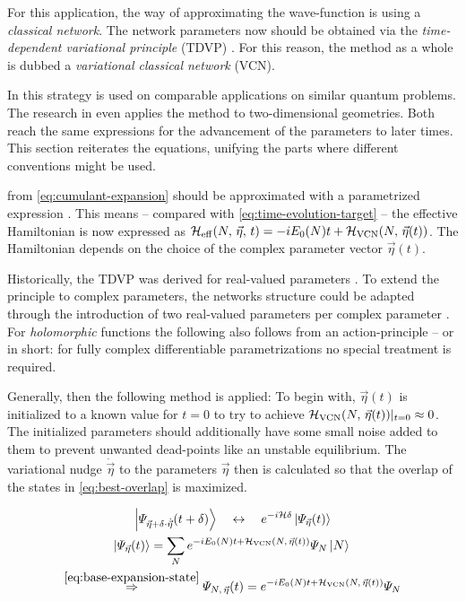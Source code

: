 For this application, the way of approximating the wave-function is using a \emph{classical network}. 
The network parameters now should be obtained via the \emph{time-dependent variational principle} (TDVP) \cite{originalDerivationTimeDependendVariationalPrinciple}.
For this reason, the method as a whole is dubbed a \emph{variational classical network} (VCN).

In \cite{variationalClassicalNetworksPaper} this strategy is used on comparable applications on similar quantum problems.
The research in \cite{probabilitySamplingRequirementVCN} even applies the method to two-dimensional geometries.
Both reach the same expressions for the advancement of the parameters to later times.
This section reiterates the equations, unifying the parts where different conventions might be used.

\HNOft from \autoref{eq:cumulant-expansion} should be approximated with a parametrized expression .
This means -- compared with \autoref{eq:time-evolution-target} -- the effective Hamiltonian is now expressed as $\HeffOft[N,\,\vec{\eta}] = -i E_0(N) t + \Hvcn{\vec{\eta}(t)}$.
The Hamiltonian depends on the choice of the complex parameter vector $\vec{\eta}(t)$.

Historically, the TDVP was derived for real-valued parameters \cite{originalDerivationTimeDependendVariationalPrinciple}.
To extend the principle to complex parameters, the networks structure could be adapted through the introduction of two real-valued parameters per complex parameter \cite{TDVPcomplexPrefactors}.
For \emph{holomorphic} functions the following also follows from an action-principle \cite{probabilitySamplingRequirementVCN} -- or in short: for fully complex differentiable \cite{complexDifferentiation} parametrizations no special treatment is required.

Generally, then the following method is applied: To begin with, $\vec{\eta}(t)$ is initialized to a known value for $t=0$ to try to achieve $\Hvcn{\vec{\eta}(t)} \vert_{t=0} \approx 0$.
The initialized parameters should additionally have some small noise added to them to prevent unwanted dead-points like an unstable equilibrium.
The variational nudge $\dot{\vec{\eta}}$ to the parameters $\vec{\eta}$ then is calculated so that the overlap of the states in \autoref{eq:best-overlap} is maximized.

\begin{equation}
    \label{eq:best-overlap}
    \begin{gathered}
        \ketpsiEta{\vec{\eta} + \delta \cdot \dot{\vec{\eta}}}{t + \delta} \quad\leftrightarrow\quad e^{-i \hamiltonian \delta} \ketpsiEta{\vec{\eta}}{t}
        \\
        \ketpsiEta{\vec{\eta}}{t} = \lsum[N] e^{-i E_0(N) t + \Hvcn{\vec{\eta}(t)}} \psiN \ketN{}
        \\
        \stackrel{\ref{eq:base-expansion-state}}{\Rightarrow} \psiEta{N,\,\vec{\eta}}{t} = e^{-i E_0(N) t + \Hvcn{\vec{\eta}(t)}} \psiN
    \end{gathered}
\end{equation}

